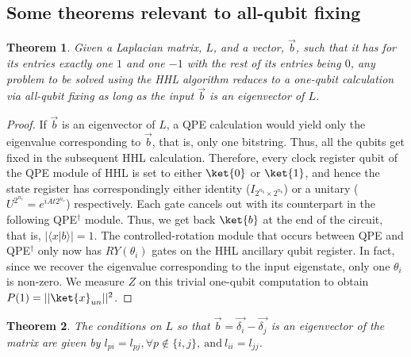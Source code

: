 \documentclass[%
 reprint,
 superscriptaddress,
 amsmath,amssymb,
 aps,
 pra,
floatfix,
nofootinbib,
]{revtex4-2}
\newtheorem{theorem}{Theorem}
\theoremstyle{definition}
\theoremstyle{remark}
\begin{document}
\begin{appendix}
\section{Some theorems relevant to all-qubit fixing}\label{sec:aqf} 

\begin{theorem} \label{th:lapmat} 
Given a Laplacian matrix, $L$, and a vector, $\vec{b}$, such that it has for its entries exactly one $1$ and one $-1$ with the rest of its entries being $0$, any problem to be solved using the HHL algorithm reduces to a one-qubit calculation via all-qubit fixing as long as the input $\vec{b}$ is an eigenvector of $L$. 
\end{theorem}

\begin{proof}
If $\vec{b}$ is an eigenvector of $L$, a QPE calculation would yield only the eigenvalue corresponding to $\vec{b}$, that is, only one bitstring. Thus, all the qubits get fixed in the subsequent HHL calculation. Therefore, every clock register qubit of the QPE module of HHL is set to either $\ket{0}$ or $\ket{1}$, and hence the state register has correspondingly either identity ($I_{2^{n_b}\times2^{n_b}}$) or a unitary ($U^{2^{n_r}}=e^{iAt 2^{n_r}}$) respectively. Each gate cancels out with its counterpart in the following QPE$^\dag$ module. Thus, we get back $\ket{b}$ at the end of the circuit, that is, $|\langle x|b \rangle|=1$. The controlled-rotation module that occurs between QPE and QPE$^\dag$ only now has $RY(\theta_i)$ gates on the HHL ancillary qubit register. In fact, since we recover the eigenvalue corresponding to the input eigenstate, only one $\theta_i$ is non-zero. We measure $Z$ on this trivial one-qubit computation to obtain $P(1) = || \ket{x}_{un}||^2$. 
\end{proof} 


\begin{theorem} \label{th:condonlapmat}
The conditions on $L$ so that $\vec{b}=\vec{\delta_i}-\vec{\delta_j}$ is an eigenvector of the matrix are given by $l_{pi}=l_{pj}, \forall p \not \in \{i, j\}, \ \mathrm{and} \ l_{ii}=l_{jj}$. 
\end{theorem}


\end{appendix}
\end{document}
